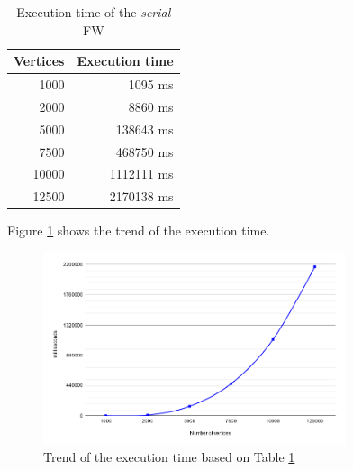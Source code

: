 \begin{table}[h!]
\centering
\begin{tabular}{|r|r|}
\hline
\rowcolor[HTML]{3166FF} 
{\color[HTML]{FFFFFF} \textbf{Vertices}} & {\color[HTML]{FFFFFF} \textbf{Execution time}} \\ \hline
1000                                     & 1095 ms                                        \\ \hline
2000                                     & 8860 ms                                        \\ \hline
5000                                     & 138643 ms                                      \\ \hline
7500                                     & 468750 ms                                      \\ \hline
10000                                    & 1112111 ms                                     \\ \hline
12500                                    & 2170138 ms                                     \\ \hline
\end{tabular}
\caption{Execution time of the \emph{serial} FW}                                                                                                                                            
\label{tab:seq-time} 
\end{table}

Figure \ref*{fig:seq-time} shows the trend of the execution time. 

\begin{figure}[h!]
\centering                                                                        
\includegraphics[width=3.5in]{images/seq-time}
\captionsetup{justification=centering,margin=2cm}                                                                                                                                   
\caption{Trend of the execution time based on Table \ref*{tab:seq-time}}                                                                                                                                            
\label{fig:seq-time}                                                                                                                                                           
\end{figure}



